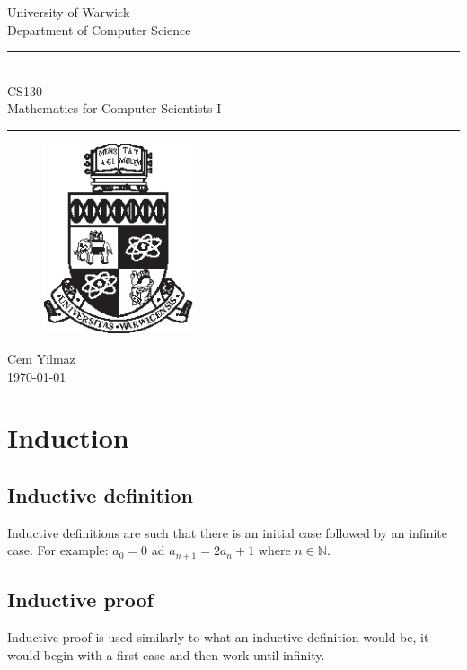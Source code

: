\documentclass[a4paper]{article}
\theoremstyle{plain}
\theoremstyle{definition}
\theoremstyle{remark}
\begin{document}
\begin{titlepage}
\begin{center}
\large
University of Warwick \\
Department of Computer Science \\

\huge
\vspace{50mm}
\rule{\linewidth}{0.5pt}\\
CS130\\
\vspace{5mm}
\Large
Mathematics for Computer Scientists I
\rule{\linewidth}{0.5pt}
\vspace{5mm}
\begin{figure}[H]
	\centering
	\includegraphics[width=0.4\textwidth]{crest_black.eps}
	\label{fig:}
\end{figure}
\vspace{37mm}
Cem Yilmaz\\
\today
\end{center}
\end{titlepage}

\tableofcontents 
\newpage 
\section{Induction} 
\subsection{Inductive definition} 
Inductive definitions are such that there is an initial case followed by an infinite case. For example: $a_0=0$ ad $a_{n+1} = 2a_n+1$ where $n \in \mathbb{N}$.  
\subsection{Inductive proof} 
Inductive proof is used similarly to what an inductive definition would be, it would begin with a first case and then work until infinity.  
\end{document}

